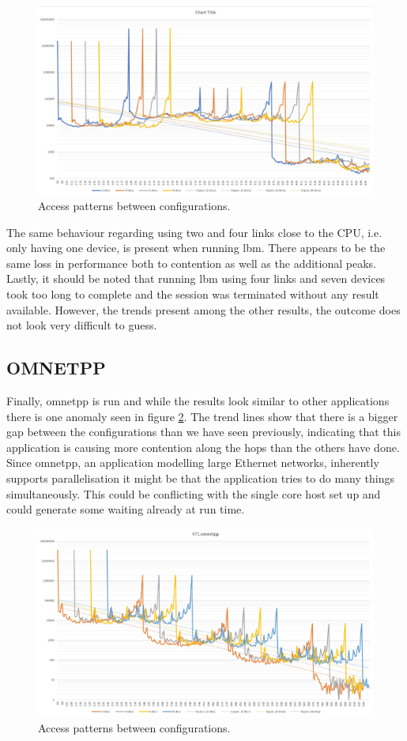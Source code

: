 \begin{figure}[!ht]
    \centering
    \includegraphics[width=0.75\linewidth]{figure/470-x_4.jpg}
    \caption{Access patterns between configurations.}
    \label{Memory-access-470}
\end{figure}

The same behaviour regarding using two and four links close to the CPU, i.e. only having one device, is present when running lbm. There appears to be the same loss in performance both to contention as well as the additional peaks. Lastly, it should be noted that running lbm using four links and seven devices took too long to complete and the session was terminated without any result available. However, the trends present among the other results, the outcome does not look very difficult to guess.

\subsection{OMNETPP}
Finally, omnetpp is run and while the results look similar to other applications there is one anomaly seen in figure \ref{Memory-access-471}. The trend lines show that there is a bigger gap between the configurations than we have seen previously, indicating that this application is causing more contention along the hops than the others have done. Since omnetpp, an application modelling large Ethernet networks, inherently supports parallelisation it might be that the application tries to do many things simultaneously. This could be conflicting with the single core host set up and could generate some waiting already at run time. 
\bigskip

\begin{figure}[!ht]
    \centering
    \includegraphics[width=0.75\linewidth]{figure/471-x_4.jpg}
    \caption{Access patterns between configurations.}
    \label{Memory-access-471}
\end{figure}

